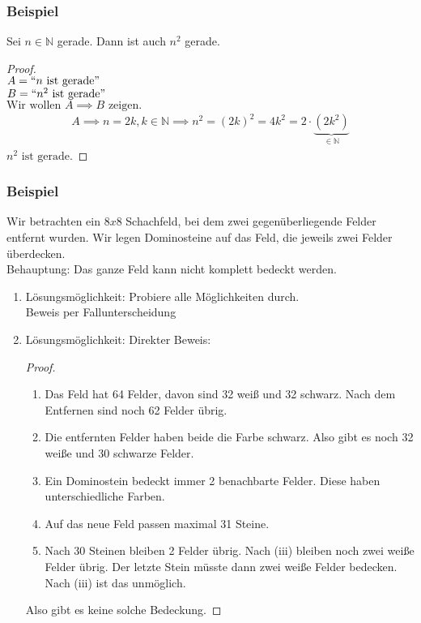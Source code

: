 \documentclass{article}
\begin{document}
    \subsubsection{Beispiel}
      Sei $n \in \mathbb{N}$ gerade. Dann ist auch $n^2$ gerade.

      \begin{proof} \mbox{} \\
        $A = ``n \text{ ist gerade}"$ \\
        $B = ``n^2 \text{ ist gerade}"$ \\
        $\text{Wir wollen } A \implies B \text{ zeigen.}$
        \begin{align*}
          A \implies n=2k, k \in \mathbb{N}
          \implies n^2=(2k)^2 = 4k^2 =
          2\cdot\underbrace{(2k^2)}_{\in \mathbb{N}}
        \end{align*}
        $n^2 \text{ ist gerade.}$
      \end{proof}

    \subsubsection{Beispiel}
      Wir betrachten ein $8x8$ Schachfeld, bei dem zwei gegenüberliegende Felder
      entfernt wurden. Wir legen Dominosteine auf das Feld, die jeweils zwei
      Felder überdecken. \\
      Behauptung: Das ganze Feld kann nicht komplett bedeckt werden.

      \begin{enumerate}[label=\arabic*.]
        \item Lösungsmöglichkeit: Probiere alle Möglichkeiten durch.\\
          Beweis per Fallunterscheidung
        \item Lösungsmöglichkeit: Direkter Beweis:
          \begin{proof} \mbox{}
            \begin{enumerate}[label=(\roman*)]
              \item Das Feld hat 64 Felder, davon sind 32 weiß und 32 schwarz.
                Nach dem Entfernen sind noch 62 Felder übrig.
              \item Die entfernten Felder haben beide die Farbe schwarz. Also
                gibt es noch 32 weiße und 30 schwarze Felder.
              \item Ein Dominostein bedeckt immer 2 benachbarte Felder. Diese
                haben unterschiedliche Farben.
              \item Auf das neue Feld passen maximal 31 Steine.
              \item Nach 30 Steinen bleiben 2 Felder übrig. Nach (iii)  bleiben
                noch zwei weiße Felder übrig. Der letzte Stein müsste dann zwei
                weiße Felder bedecken. Nach (iii) ist das unmöglich.
            \end{enumerate}
            Also gibt es keine solche Bedeckung.
          \end{proof}
      \end{enumerate}
\end{document}
